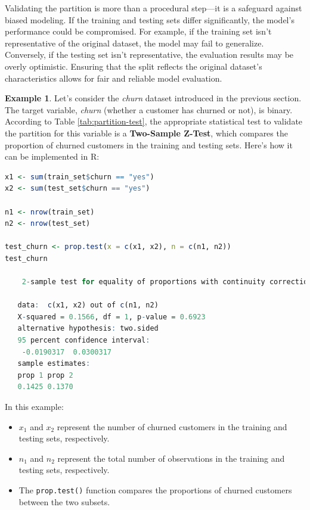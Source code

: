 \documentclass[
]{book}
\newcommand{\passthrough}[1]{#1}
\providecommand{\tightlist}{%
  \setlength{\itemsep}{0pt}\setlength{\parskip}{0pt}}
\theoremstyle{definition}
\theoremstyle{definition}
\newtheorem{example}{Example}[chapter]
\theoremstyle{definition}
\theoremstyle{definition}
\theoremstyle{remark}
\begin{document}
Validating the partition is more than a procedural step---it is a safeguard against biased modeling. If the training and testing sets differ significantly, the model's performance could be compromised. For example, if the training set isn't representative of the original dataset, the model may fail to generalize. Conversely, if the testing set isn't representative, the evaluation results may be overly optimistic. Ensuring that the split reflects the original dataset's characteristics allows for fair and reliable model evaluation.

\begin{example}
\protect\hypertarget{exm:ex-test-partition}{}\label{exm:ex-test-partition}Let's consider the \emph{churn} dataset introduced in the previous section. The target variable, \emph{churn} (whether a customer has churned or not), is binary. According to Table \ref{tab:partition-test}, the appropriate statistical test to validate the partition for this variable is a \textbf{Two-Sample Z-Test}, which compares the proportion of churned customers in the training and testing sets. Here's how it can be implemented in R:

\begin{lstlisting}[language=R]
x1 <- sum(train_set$churn == "yes")
x2 <- sum(test_set$churn == "yes")

n1 <- nrow(train_set)
n2 <- nrow(test_set)

test_churn <- prop.test(x = c(x1, x2), n = c(n1, n2))
test_churn
   
    2-sample test for equality of proportions with continuity correction
   
   data:  c(x1, x2) out of c(n1, n2)
   X-squared = 0.1566, df = 1, p-value = 0.6923
   alternative hypothesis: two.sided
   95 percent confidence interval:
    -0.0190317  0.0300317
   sample estimates:
   prop 1 prop 2 
   0.1425 0.1370
\end{lstlisting}

In this example:

\begin{itemize}
\tightlist
\item
  \(x_1\) and \(x_2\) represent the number of churned customers in the training and testing sets, respectively.\\
\item
  \(n_1\) and \(n_2\) represent the total number of observations in the training and testing sets, respectively.\\
\item
  The \passthrough{\lstinline!prop.test()!} function compares the proportions of churned customers between the two subsets.
\end{itemize}


\end{example}
\end{document}
